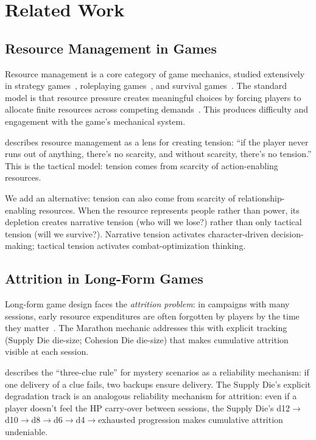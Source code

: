 
\section{Related Work}
\label{sec:related}

\subsection{Resource Management in Games}

Resource management is a core category of game mechanics, studied extensively in
strategy games~\cite{juul2005half}, roleplaying games~\cite{dungeons2014players},
and survival games~\cite{fullerton2008}. The standard model is that resource pressure
creates meaningful choices by forcing players to allocate finite resources across
competing demands~\cite{salen2004rules}. This produces difficulty and engagement with
the game's mechanical system.

\citet{schell2008art} describes resource management as a lens for creating tension:
``if the player never runs out of anything, there's no scarcity, and without scarcity,
there's no tension.'' This is the tactical model: tension comes from scarcity of
action-enabling resources.

We add an alternative: tension can also come from scarcity of relationship-enabling
resources. When the resource represents people rather than power, its depletion
creates narrative tension (who will we lose?) rather than only tactical tension
(will we survive?). Narrative tension activates character-driven decision-making;
tactical tension activates combat-optimization thinking.

\subsection{Attrition in Long-Form Games}

Long-form game design faces the \textit{attrition problem}: in campaigns with many
sessions, early resource expenditures are often forgotten by players by the time they
matter~\cite{perkins2017dungeon}. The Marathon mechanic addresses this with explicit
tracking (Supply Die die-size; Cohesion Die die-size) that makes cumulative attrition
visible at each session.

\citet{alexandrian2012} describes the ``three-clue rule'' for mystery scenarios as
a reliability mechanism: if one delivery of a clue fails, two backups ensure delivery.
The Supply Die's explicit degradation track is an analogous reliability mechanism for
attrition: even if a player doesn't feel the HP carry-over between sessions, the Supply
Die's d12$\to$d10$\to$d8$\to$d6$\to$d4$\to$exhausted progression makes cumulative
attrition undeniable.

